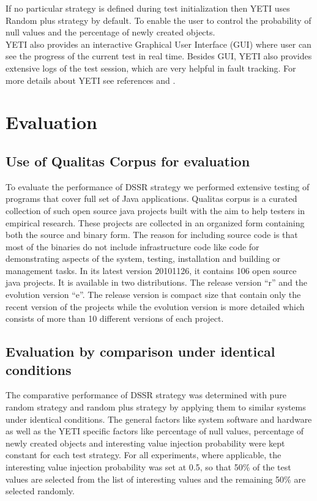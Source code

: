 \documentclass[conference]{IEEEtran}
\begin{document}
If no particular strategy is defined during test initialization then YETI uses Random plus strategy by default. To enable the user to control the probability of null values and the percentage of newly created objects.\\
\indent YETI also provides an interactive Graphical User Interface (GUI) where user can see the progress of the current test in real time. Besides GUI, YETI also provides extensive logs of the test session, which are very helpful in fault tracking. For more details about YETI see references \cite{Oriol2010} and \cite{Oriol2010a}.



\section{Evaluation}

\subsection{Use of Qualitas Corpus for evaluation}
To evaluate the performance of DSSR strategy we performed extensive testing of programs that cover full set of Java applications. Qualitas corpus \cite{Tempero2010a} is a curated collection of such open source java projects built with the aim to help testers in empirical research. These projects are collected in an organized form containing both the source and binary form. The reason for including source code is that most of the binaries do not include infrastructure code like code for demonstrating aspects of the system, testing, installation and building or management tasks. In its latest version 20101126, it contains 106 open source java projects. It is available in two distributions. The release version ``r'' and the evolution version ``e''. The release version is compact size that contain only the recent version of the projects while the evolution version is more detailed which consists of more than 10 different versions of each project.\\

\subsection{Evaluation by comparison under identical conditions}
The comparative performance of DSSR strategy was determined with pure random strategy and random plus strategy by applying them to similar systems under identical conditions. The general factors like system software and hardware as well as the YETI specific factors like percentage of null values, percentage of newly created objects and interesting value injection probability were kept constant for each test strategy. For all experiments, where applicable, the interesting value injection probability was set at 0.5, so that 50\% of the test values are selected from the list of interesting values and the remaining 50\% are selected randomly.\\
\end{document}
